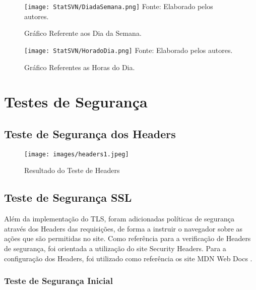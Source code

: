 \documentclass[
    12pt,               %
    openright,          %
    oneside,
    a4paper,            %
    BIBLATEX,           %
    TODO,               %
    english,            %
    brazil              %
    ]{ifsp-spo-inf-ctds}
\begin{document}
    \begin{figure}[H]
                \centering
                \caption{Gráfico Referente aos Dia da Semana.}
                \texttt{[image: StatSVN/DiadaSemana.png]}
                {\footnotesize Fonte: Elaborado pelos autores.}
                \label{fig:diaSemana}
            \end{figure} 

    \begin{figure}[H]
                \centering
                \caption{Gráfico Referentes as Horas do Dia.}
                \texttt{[image: StatSVN/HoradoDia.png]}
                {\footnotesize Fonte: Elaborado pelos autores.}
                \label{fig:horaDia}
            \end{figure} 

\section{Testes de Segurança}

    \subsection{Teste de Segurança dos Headers}

    \begin{figure}[H]
        \centering
        \texttt{[image: images/headers1.jpeg]}    \caption{Resultado do Teste de Headers}
        \label{fig:header}
    \end{figure}

    \subsection{Teste de Segurança SSL}
        Além da implementação do TLS, foram adicionadas políticas de segurança através dos Headers das requisições, de forma a instruir o navegador sobre as ações que são permitidas no site.
        Como referência para a verificação de Headers de segurança, foi orientada a utilização do site Security Headers.
        Para a configuração dos Headers, foi utilizado como referência os site MDN Web Docs .


    \subsubsection{ Teste de Segurança Inicial}
\end{document}

